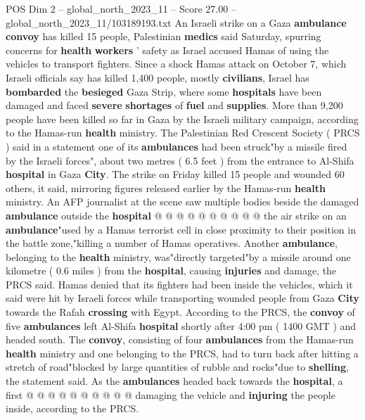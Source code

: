 \begin{textsample}{POS Dim 2 – global\_north\_2023\_11 – Score 27.00 – global\_north\_2023\_11/103189193.txt}  \label{ex:f2_pos_237}
An Israeli strike on a Gaza \textbf{ambulance} \textbf{convoy} has killed 15 people, Palestinian \textbf{medics} said Saturday, spurring concerns for \textbf{health} \textbf{workers} ' safety as Israel accused Hamas of using the vehicles to transport fighters.
Since a shock Hamas attack on October 7, which Israeli officials say has killed 1,400 people, mostly \textbf{civilians}, Israel has \textbf{bombarded} the \textbf{besieged} Gaza Strip, where some \textbf{hospitals} have been damaged and faced \textbf{severe} \textbf{shortages} of \textbf{fuel} and \textbf{supplies}.
More than 9,200 people have been killed so far in Gaza by the Israeli military campaign, according to the Hamas-run \textbf{health} ministry.
The Palestinian Red Crescent Society ( PRCS ) said in a statement one of its \textbf{ambulances} had been struck"by a missile fired by the Israeli forces", about two metres ( 6.5 feet ) from the entrance to Al-Shifa \textbf{hospital} in Gaza \textbf{City}.
The strike on Friday killed 15 people and wounded 60 others, it said, mirroring figures released earlier by the Hamas-run \textbf{health} ministry.
An AFP journalist at the scene saw multiple bodies beside the damaged \textbf{ambulance} outside the \textbf{hospital} @ @ @ @ @ @ @ @ @ @ the air strike on an \textbf{ambulance}"used by a Hamas terrorist cell in close proximity to their position in the battle zone,"killing a number of Hamas operatives.
Another \textbf{ambulance}, belonging to the \textbf{health} ministry, was"directly targeted"by a missile around one kilometre ( 0.6 miles ) from the \textbf{hospital}, causing \textbf{injuries} and damage, the PRCS said.
Hamas denied that its fighters had been inside the vehicles, which it said were hit by Israeli forces while transporting wounded people from Gaza \textbf{City} towards the Rafah \textbf{crossing} with Egypt.
According to the PRCS, the \textbf{convoy} of five \textbf{ambulances} left Al-Shifa \textbf{hospital} shortly after 4:00 pm ( 1400 GMT ) and headed south.
The \textbf{convoy}, consisting of four \textbf{ambulances} from the Hamas-run \textbf{health} ministry and one belonging to the PRCS, had to turn back after hitting a stretch of road"blocked by large quantities of rubble and rocks"due to \textbf{shelling}, the statement said.
As the \textbf{ambulances} headed back towards the \textbf{hospital}, a first @ @ @ @ @ @ @ @ @ @ damaging the vehicle and \textbf{injuring} the people inside, according to the PRCS.

\end{textsample}
